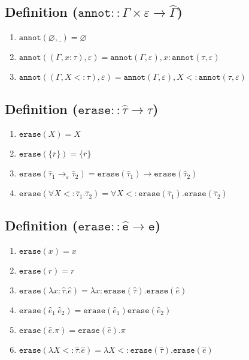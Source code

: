 \documentclass{llncs}
\newcommand{\keywadj}[1]{\mathtt{#1}}
\newcommand{\kwa}[1]{\keywadj{ #1 }}
\newcommand{\annot}[2]{
	\keywadj{annot}(#1, #2)
}
\newcommand{\erase}[1]{
	\keywadj{erase}(#1)
}
\begin{document}
\subsection*{Definition ($\kwa{annot :: \Gamma \times \varepsilon \rightarrow \hat \Gamma}$)}

\begin{enumerate}
	\item $\kwa{annot}(\varnothing, \_) = \varnothing$
	\item $\kwa{annot}((\Gamma, x: \tau), \varepsilon) = \kwa{annot}(\Gamma, \varepsilon), x: \kwa{annot}(\tau, \varepsilon)$
	\item $\kwa{annot}((\Gamma, X <: \tau), \varepsilon) = \kwa{annot}(\Gamma, \varepsilon), X <: \annot{\tau}{\varepsilon}$
\end{enumerate}

\subsection*{Definition ($\kwa{erase :: \hat \tau \rightarrow \tau}$)}

\begin{enumerate}
	\item $\erase{X} = X$
	\item $\erase{\{ \bar r \}} = \{ \bar r \}$
	\item $\kwa{erase}(\hat \tau_1 \rightarrow_{\varepsilon} \hat \tau_2) = \kwa{erase}(\hat \tau_1) \rightarrow \kwa{erase}(\hat \tau_2)$
	\item $\erase{\forall X <: \hat \tau_1. \hat \tau_2} = \forall X <: \erase{\hat \tau_1}. \erase{\hat \tau_2}$
\end{enumerate}

\subsection*{Definition ($\kwa{erase :: \hat e \rightarrow e}$)}

\begin{enumerate}
	\item $\kwa{erase}(x) = x$
	\item $\kwa{erase}(r) = r$
	\item $\kwa{erase}(\lambda x: \hat \tau.\hat e) = \lambda x: \kwa{erase}(\hat \tau).\kwa{erase}(\hat e)$
	\item $\kwa{erase}(\hat e_1~\hat e_2) = \kwa{erase}(\hat e_1) \kwa{erase}(\hat e_2)$
	\item $\kwa{erase}(\hat e.\pi) = \kwa{erase}(\hat e).\pi$
	\item $\erase{\lambda X <: \hat \tau. \hat e} = \lambda X <: \erase{\hat \tau}. \erase{\hat e}$
\end{enumerate}
\end{document}
